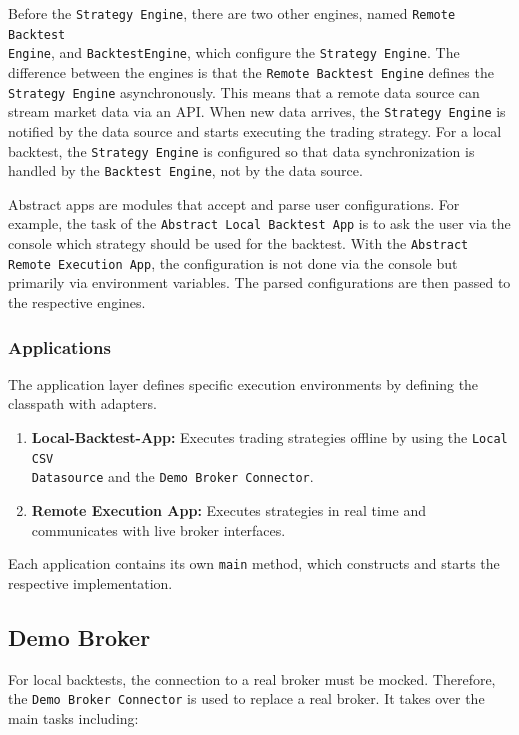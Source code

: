 \noindent
Before the \texttt{Strategy Engine}, there are two other engines, named \texttt{Remote Backtest}\\\texttt{Engine}, and \texttt{BacktestEngine}, which configure the \texttt{Strategy Engine}.
The difference between the engines is that the \texttt{Remote Backtest Engine} defines the \texttt{Strategy Engine} asynchronously.
This means that a remote data source can stream market data via an API.
When new data arrives, the \texttt{Strategy Engine} is notified by the data source and starts executing the trading strategy.
For a local backtest, the \texttt{Strategy Engine} is configured so that data synchronization is handled by the \texttt{Backtest Engine}, not by the data source.

Abstract apps are modules that accept and parse user configurations.
For example, the task of the \texttt{Abstract Local Backtest App} is to ask the user via the console which strategy should be used for the backtest.
With the \texttt{Abstract Remote Execution App}, the configuration is not done via the console but primarily via environment variables.
The parsed configurations are then passed to the respective engines.

\subsubsection{Applications}

The application layer defines specific execution environments by defining the classpath with adapters.

\begin{enumerate}
    \item \textbf{Local-Backtest-App:} Executes trading strategies offline by using the \texttt{Local CSV }\\\texttt{Datasource} and the \texttt{Demo Broker Connector}.
    \item \textbf{Remote Execution App:} Executes strategies in real time and communicates with live broker interfaces.
\end{enumerate}

\noindent
Each application contains its own \texttt{main} method, which constructs and starts the respective implementation.

\subsection{Demo Broker}

For local backtests, the connection to a real broker must be mocked.
Therefore, the \texttt{Demo Broker Connector} is used to replace a real broker.
It takes over the main tasks including:

